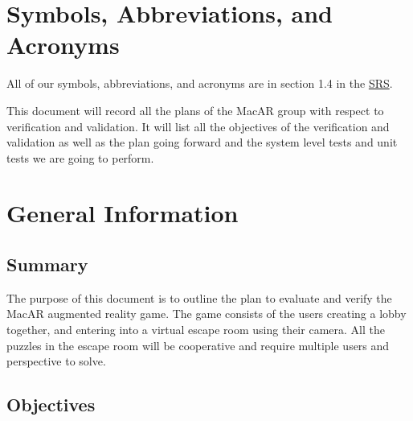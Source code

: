 \documentclass[12pt, titlepage]{article}
\begin{document}

\newpage

\tableofcontents

\listoftables

\newpage

\section{Symbols, Abbreviations, and Acronyms}

All of our symbols, abbreviations, and acronyms are in section 1.4 in the  \href{https://github.com/SammyG7/Mac-AR/blob/main/docs/SRS/SRS.pdf}{SRS}.

\newpage


This document will record all the plans of the MacAR group with respect to verification and validation. It will list all the objectives of the verification and validation as well as the plan going forward and the system level tests and unit tests we are going to perform.  

\section{General Information}

\subsection{Summary}

The purpose of this document is to outline the plan to evaluate and verify the MacAR augmented reality game. The game consists of the users creating a lobby together, and entering into a virtual escape room using their camera. All the puzzles in the escape room will be cooperative and require multiple users and perspective to solve. 

\subsection{Objectives}
\end{document}

